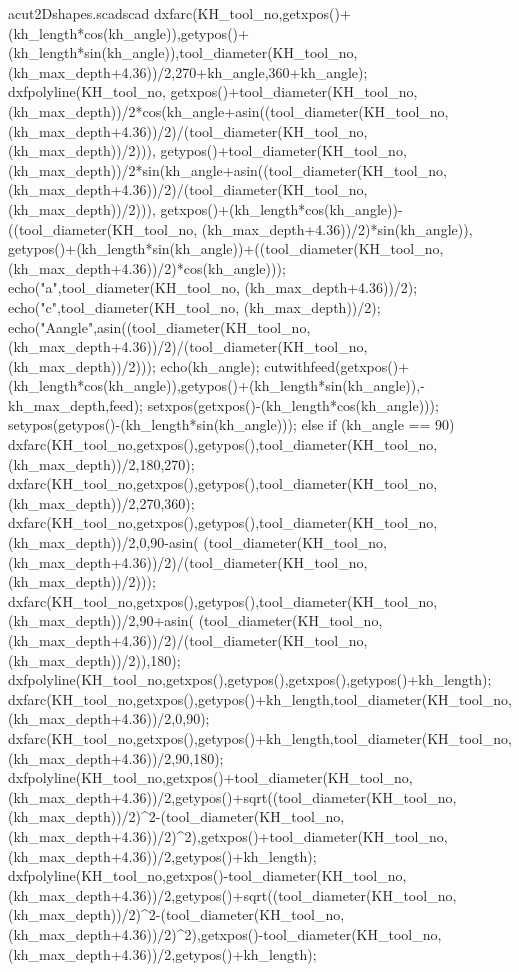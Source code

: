 \documentclass{ltxdoc}
\begin{document}
\begin{writecode}{a}{cut2Dshapes.scad}{scad}
{dxfarc(KH_tool_no,getxpos()+(kh_length*cos(kh_angle)),getypos()+(kh_length*sin(kh_angle)),tool_diameter(KH_tool_no, (kh_max_depth+4.36))/2,270+kh_angle,360+kh_angle);
dxfpolyline(KH_tool_no,
 getxpos()+tool_diameter(KH_tool_no, (kh_max_depth))/2*cos(kh_angle+asin((tool_diameter(KH_tool_no, (kh_max_depth+4.36))/2)/(tool_diameter(KH_tool_no, (kh_max_depth))/2))),
 getypos()+tool_diameter(KH_tool_no, (kh_max_depth))/2*sin(kh_angle+asin((tool_diameter(KH_tool_no, (kh_max_depth+4.36))/2)/(tool_diameter(KH_tool_no, (kh_max_depth))/2))),
 getxpos()+(kh_length*cos(kh_angle))-((tool_diameter(KH_tool_no, (kh_max_depth+4.36))/2)*sin(kh_angle)),
 getypos()+(kh_length*sin(kh_angle))+((tool_diameter(KH_tool_no, (kh_max_depth+4.36))/2)*cos(kh_angle)));
echo("a",tool_diameter(KH_tool_no, (kh_max_depth+4.36))/2);
echo("c",tool_diameter(KH_tool_no, (kh_max_depth))/2);
echo("Aangle",asin((tool_diameter(KH_tool_no, (kh_max_depth+4.36))/2)/(tool_diameter(KH_tool_no, (kh_max_depth))/2)));
echo(kh_angle);
 cutwithfeed(getxpos()+(kh_length*cos(kh_angle)),getypos()+(kh_length*sin(kh_angle)),-kh_max_depth,feed);
 setxpos(getxpos()-(kh_length*cos(kh_angle)));
 setypos(getypos()-(kh_length*sin(kh_angle)));
  } else if (kh_angle == 90) {
dxfarc(KH_tool_no,getxpos(),getypos(),tool_diameter(KH_tool_no, (kh_max_depth))/2,180,270);
dxfarc(KH_tool_no,getxpos(),getypos(),tool_diameter(KH_tool_no, (kh_max_depth))/2,270,360);
dxfarc(KH_tool_no,getxpos(),getypos(),tool_diameter(KH_tool_no, (kh_max_depth))/2,0,90-asin(
    (tool_diameter(KH_tool_no, (kh_max_depth+4.36))/2)/(tool_diameter(KH_tool_no, (kh_max_depth))/2)));
dxfarc(KH_tool_no,getxpos(),getypos(),tool_diameter(KH_tool_no, (kh_max_depth))/2,90+asin(
    (tool_diameter(KH_tool_no, (kh_max_depth+4.36))/2)/(tool_diameter(KH_tool_no, (kh_max_depth))/2)),180);
 dxfpolyline(KH_tool_no,getxpos(),getypos(),getxpos(),getypos()+kh_length);
dxfarc(KH_tool_no,getxpos(),getypos()+kh_length,tool_diameter(KH_tool_no, (kh_max_depth+4.36))/2,0,90);
dxfarc(KH_tool_no,getxpos(),getypos()+kh_length,tool_diameter(KH_tool_no, (kh_max_depth+4.36))/2,90,180);
 dxfpolyline(KH_tool_no,getxpos()+tool_diameter(KH_tool_no, (kh_max_depth+4.36))/2,getypos()+sqrt((tool_diameter(KH_tool_no, (kh_max_depth))/2)^2-(tool_diameter(KH_tool_no, (kh_max_depth+4.36))/2)^2),getxpos()+tool_diameter(KH_tool_no, (kh_max_depth+4.36))/2,getypos()+kh_length);
 dxfpolyline(KH_tool_no,getxpos()-tool_diameter(KH_tool_no, (kh_max_depth+4.36))/2,getypos()+sqrt((tool_diameter(KH_tool_no, (kh_max_depth))/2)^2-(tool_diameter(KH_tool_no, (kh_max_depth+4.36))/2)^2),getxpos()-tool_diameter(KH_tool_no, (kh_max_depth+4.36))/2,getypos()+kh_length);
}
\end{writecode}
\end{document}
